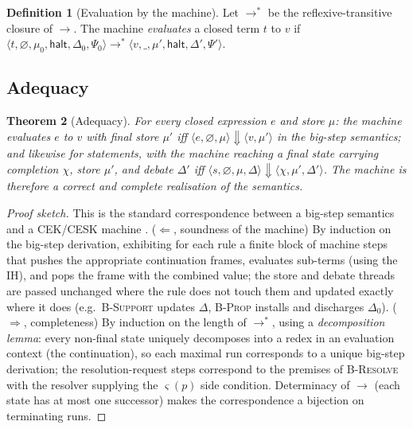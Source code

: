 \documentclass[11pt,a4paper]{article}
\theoremstyle{plain}
\newtheorem{theorem}{Theorem}[section]
\theoremstyle{definition}
\newtheorem{definition}[theorem]{Definition}
\theoremstyle{remark}
\newcommand{\store}{\mu}
\newcommand{\dbt}{\Delta}
\newcommand{\sys}{\Psi}
\newcommand{\stepm}{\longrightarrow}       %
\newcommand{\evalto}{\Downarrow}           %
\newcommand{\rn}[1]{\textsc{#1}}
\begin{document}
\begin{definition}[Evaluation by the machine]
\label{def:macheval}
Let $\stepm^{*}$ be the reflexive-transitive closure of $\stepm$. The machine
\emph{evaluates} a closed term $t$ to $v$ if
$\langle t,\varnothing,\store_0,\mathsf{halt},\dbt_0,\sys_0\rangle\stepm^{*}
\langle v,\_,\store',\mathsf{halt},\dbt',\sys'\rangle$.
\end{definition}

\subsection{Adequacy}

\begin{theorem}[Adequacy]
\label{thm:adequacy}
For every closed expression $e$ and store $\store$: the machine evaluates $e$ to
$v$ with final store $\store'$ \emph{iff} $\langle e,\varnothing,\store\rangle
\evalto\langle v,\store'\rangle$ in the big-step semantics; and likewise for
statements, with the machine reaching a final state carrying completion $\chi$,
store $\store'$, and debate $\dbt'$ iff $\langle s,\varnothing,\store,\dbt
\rangle\evalto\langle\chi,\store',\dbt'\rangle$. The machine is therefore a
correct and complete realisation of the semantics.
\end{theorem}
\begin{proof}[Proof sketch]
This is the standard correspondence between a big-step semantics and a
CEK/CESK machine \citep{ager2003,reynolds1972,felleisen1992}. ($\Leftarrow$,
soundness of the machine) By induction on the big-step derivation, exhibiting
for each rule a finite block of machine steps that pushes the appropriate
continuation frames, evaluates sub-terms (using the IH), and pops the frame with
the combined value; the store and debate threads are passed unchanged where the
rule does not touch them and updated exactly where it does (e.g.\ \rn{B-Support}
updates $\dbt$, \rn{B-Prop} installs and discharges $\dbt_0$). ($\Rightarrow$,
completeness) By induction on the length of $\stepm^{*}$, using a
\emph{decomposition lemma}: every non-final state uniquely decomposes into a
redex in an evaluation context (the continuation), so each maximal run
corresponds to a unique big-step derivation; the resolution-request steps
correspond to the premises of \rn{B-Resolve} with the resolver supplying the
$\varsigma(p)$ side condition. Determinacy of $\stepm$ (each state has at most
one successor) makes the correspondence a bijection on terminating runs.
\end{proof}
\end{document}
